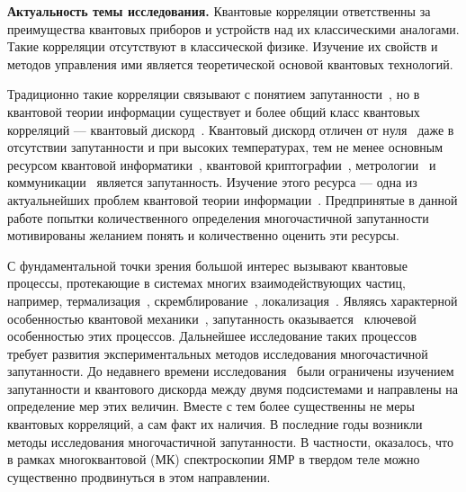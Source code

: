 

\textbf{Актуальность темы исследования.}
Квантовые корреляции ответственны за преимущества квантовых приборов и устройств над их классическими аналогами.
Такие корреляции отсутствуют в классической физике.
Изучение их свойств и методов управления ими является теоретической основой квантовых технологий.

Традиционно такие корреляции связывают с понятием запутанности~\cite{Einstein1935},
но в квантовой теории информации существует и более общий класс квантовых корреляций --- квантовый дискорд~\cite{Bera2017}.
Квантовый дискорд отличен от нуля~\cite{Yurishchev2011} даже в отсутствии запутанности и при высоких температурах,
тем не менее основным ресурсом
квантовой информатики~\cite{Arute2019},
квантовой криптографии~\cite{Gisin2002},
метрологии~\cite{Toth2012}
и коммуникации~\cite{Yin2017}
является запутанность.
Изучение этого ресурса --- одна из актуальнейших проблем квантовой теории информации~\cite{Nielsen2010}.
Предпринятые в данной работе попытки количественного определения многочастичной запутанности мотивированы
желанием понять и количественно оценить эти ресурсы.


С фундаментальной точки зрения большой интерес вызывают квантовые процессы,
протекающие в системах многих взаимодействующих частиц,
например, термализация~\cite{DAlessio2016}, скремблирование~\cite{Hosur2016},  локализация~\cite{Alvarez2010}.
Являясь характерной особенностью квантовой механики~\cite{Schrodinger1935},
запутанность оказывается~\cite{Kaufman2016, Neill2016, Garttner2018} ключевой особенностью этих процессов.
Дальнейшее исследование таких процессов
требует развития экспериментальных методов исследования многочастичной запутанности.
До недавнего времени исследования~\cite{Horodecki2009} были ограничены изучением запутанности
и квантового дискорда между двумя подсистемами
и направлены на определение мер этих величин.
Вместе с тем более существенны не меры квантовых корреляций,
а сам факт их наличия.
В последние годы возникли~\cite{Garttner2018} методы исследования многочастичной запутанности.
В частности, оказалось, что в рамках многоквантовой (МК) спектроскопии ЯМР в твердом теле можно существенно продвинуться в этом направлении.

